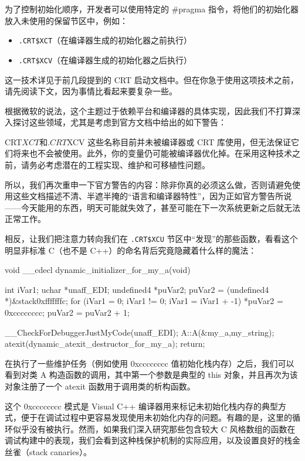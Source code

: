 为了控制初始化顺序，开发者可以使用特定的 \#pragma 指令，将他们的初始化器放入未使用的保留节区中，例如：

\begin{itemize}
\item 
\verb|.CRT$XCT|（在编译器生成的初始化器之前执行）

\item 
\verb|.CRT$XCV|（在编译器生成的初始化器之后执行）
\end{itemize}

这一技术详见于前几段提到的 CRT 启动文档中。但在你急于使用这项技术之前，请先阅读下文，因为事情比看起来要复杂一些。

根据微软的说法，这个主题过于依赖平台和编译器的具体实现，因此我们不打算深入探讨这些领域，尤其是考虑到官方文档中给出的如下警告：

\begin{shell}
CRT$XCT和.CRT$XCV 这些名称目前并未被编译器或 CRT 库使用，但无法保证它们将来也不会被使用。此外，你的变量仍可能被编译器优化掉。在采用这种技术之前，请务必考虑潜在的工程实现、维护和可移植性问题。
\end{shell}

所以，我们再次重申一下官方警告的内容：除非你真的必须这么做，否则请避免使用这些文档描述不清、半遮半掩的“语言和编译器特性”，因为正如官方警告所说——今天能用的东西，明天可能就失效了，甚至可能在下一次系统更新之后就无法正常工作。

相反，让我们把注意力转向我们在 \verb|.CRT$XCU| 节区中“发现”的那些函数，看看这个明显非标准 C（也不是 C++）的命名背后究竟隐藏着什么样的魔法：

\begin{cpp}
void __cdecl dynamic_initializer_for_my_a(void)
{
  int iVar1;
  uchar *unaff_EDI;
  undefined4 *puVar2;
  puVar2 = (undefined4 *)&stack0xfffffffc;
  for (iVar1 = 0; iVar1 != 0; iVar1 = iVar1 + -1) {
  *puVar2 = 0xcccccccc;
  puVar2 = puVar2 + 1;
}

__CheckForDebuggerJustMyCode(unaff_EDI);
  A::A(&my_a,my_string);
  atexit(dynamic_atexit_destructor_for_my_a);
  return;
}
\end{cpp}

在执行了一些维护任务（例如使用 0xcccccccc 值初始化栈内存）之后，我们可以看到对类 A 构造函数的调用，其中第一个参数是典型的 this 对象，并且再次为该对象注册了一个 atexit 函数用于调用类的析构函数。

这个 0xcccccccc 模式是 Visual C++ 编译器用来标记未初始化栈内存的典型方式，便于在调试过程中更容易发现使用未初始化内存的问题。有趣的是，这里的循环似乎没有被执行。然而，如果我们深入研究那些包含较大 C 风格数组的函数在调试构建中的表现，我们会看到这种栈保护机制的实际应用，以及设置良好的栈金丝雀（stack canaries）。

